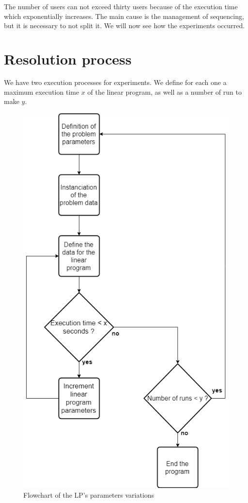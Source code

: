 \documentclass[12pt, a4paper, twoside]{memoir}
\newcommand{\newpar}{\vskip 0.2in \noindent}
\begin{document}
{	The number of users can not exceed thirty users because of the execution time which exponentially increases. The main cause is the management of sequencing, but it is necessary to not split it.
	\newpar
	We will now see how the experiments occurred.
	
	\section{Resolution process}
	
	We have two execution processes for experiments. We define for each one a maximum execution time $x$ of the linear program, as well as a number of run to make $y$.
	
	\begin{figure}
		\centering
		\begin{flushleft}
			\includegraphics[scale=0.6]{img/i_flowchartlpvariation.png}
		\end{flushleft}
		\caption{Flowchart of the LP's parameters variations}
		\label{fig:Flowchart of the LP variations}
	\end{figure}
	
}
\end{document}
